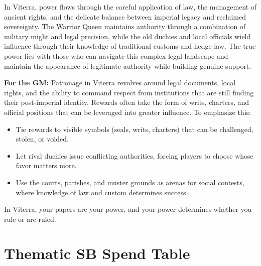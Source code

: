 \begin{tcolorbox}[colback=black!3,colframe=black!40!white,title={Patronage \& Power}]
In Viterra, power flows through the careful application of law, the management of ancient rights, and the delicate balance between imperial legacy and reclaimed sovereignty. The Warrior Queen maintains authority through a combination of military might and legal precision, while the old duchies and local officials wield influence through their knowledge of traditional customs and hedge-law. The true power lies with those who can navigate this complex legal landscape and maintain the appearance of legitimate authority while building genuine support.

\textbf{For the GM:}  
Patronage in Viterra revolves around legal documents, local rights, and the ability to command respect from institutions that are still finding their post-imperial identity. Rewards often take the form of writs, charters, and official positions that can be leveraged into greater influence. To emphasize this:
\begin{itemize}
\item Tie rewards to visible symbols (seals, writs, charters) that can be challenged, stolen, or voided.
\item Let rival duchies issue conflicting authorities, forcing players to choose whose favor matters more.
\item Use the courts, parishes, and muster grounds as arenas for social contests, where knowledge of law and custom determines success.
\end{itemize}
In Viterra, your papers are your power, and your power determines whether you rule or are ruled.
\end{tcolorbox}


\section*{Thematic SB Spend Table}
\label{sec:viterra-sb}

